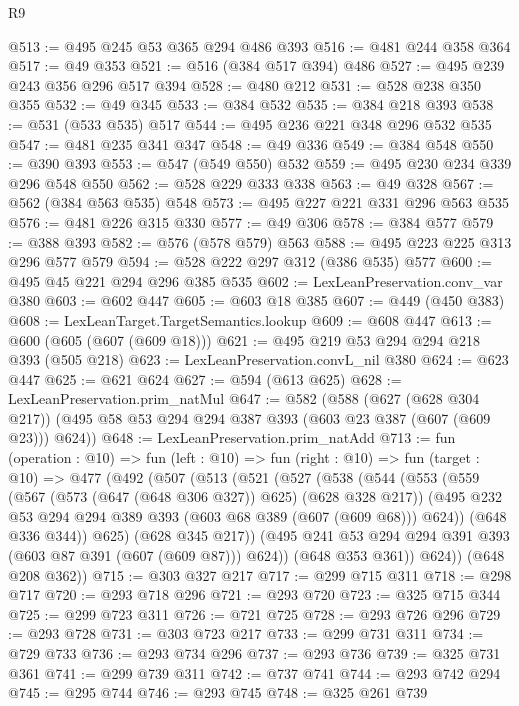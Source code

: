 \begin{lexlean}{R9}
\begin{coremodule}
@513 := @495 @245 @53 @365 @294 @486 @393
@516 := @481 @244 @358 @364
@517 := @49 @353
@521 := @516 (@384 @517 @394) @486
@527 := @495 @239 @243 @356 @296 @517 @394
@528 := @480 @212
@531 := @528 @238 @350 @355
@532 := @49 @345
@533 := @384 @532
@535 := @384 @218 @393
@538 := @531 (@533 @535) @517
@544 := @495 @236 @221 @348 @296 @532 @535
@547 := @481 @235 @341 @347
@548 := @49 @336
@549 := @384 @548
@550 := @390 @393
@553 := @547 (@549 @550) @532
@559 := @495 @230 @234 @339 @296 @548 @550
@562 := @528 @229 @333 @338
@563 := @49 @328
@567 := @562 (@384 @563 @535) @548
@573 := @495 @227 @221 @331 @296 @563 @535
@576 := @481 @226 @315 @330
@577 := @49 @306
@578 := @384 @577
@579 := @388 @393
@582 := @576 (@578 @579) @563
@588 := @495 @223 @225 @313 @296 @577 @579
@594 := @528 @222 @297 @312 (@386 @535) @577
@600 := @495 @45 @221 @294 @296 @385 @535
@602 := LexLeanPreservation.conv_var @380
@603 := @602 @447
@605 := @603 @18 @385
@607 := @449 (@450 @383)
@608 := LexLeanTarget.TargetSemantics.lookup
@609 := @608 @447
@613 := @600 (@605 (@607 (@609 @18)))
@621 := @495 @219 @53 @294 @294 @218 @393 (@505 @218)
@623 := LexLeanPreservation.convL_nil @380
@624 := @623 @447
@625 := @621 @624
@627 := @594 (@613 @625)
@628 := LexLeanPreservation.prim_natMul
@647 := @582
    (@588
      (@627 (@628 @304 @217))
      (@495 @58 @53 @294 @294 @387 @393 (@603 @23 @387 (@607 (@609 @23))) @624))
@648 := LexLeanPreservation.prim_natAdd
@713 := fun (operation : @10) =>
  fun (left : @10) =>
  fun (right : @10) =>
  fun (target : @10) =>
  @477
    (@492
      (@507
        (@513
          (@521
            (@527
              (@538
                (@544
                  (@553
                    (@559
                      (@567 (@573 (@647 (@648 @306 @327)) @625) (@628 @328 @217))
                      (@495 @232 @53 @294 @294 @389 @393 (@603 @68 @389 (@607 (@609 @68))) @624))
                    (@648 @336 @344))
                  @625)
                (@628 @345 @217))
              (@495 @241 @53 @294 @294 @391 @393 (@603 @87 @391 (@607 (@609 @87))) @624))
            (@648 @353 @361))
          @624))
      (@648 @208 @362))
@715 := @303 @327 @217
@717 := @299 @715 @311
@718 := @298 @717
@720 := @293 @718 @296
@721 := @293 @720
@723 := @325 @715 @344
@725 := @299 @723 @311
@726 := @721 @725
@728 := @293 @726 @296
@729 := @293 @728
@731 := @303 @723 @217
@733 := @299 @731 @311
@734 := @729 @733
@736 := @293 @734 @296
@737 := @293 @736
@739 := @325 @731 @361
@741 := @299 @739 @311
@742 := @737 @741
@744 := @293 @742 @294
@745 := @295 @744
@746 := @293 @745
@748 := @325 @261 @739

\end{coremodule}
\end{lexlean}
